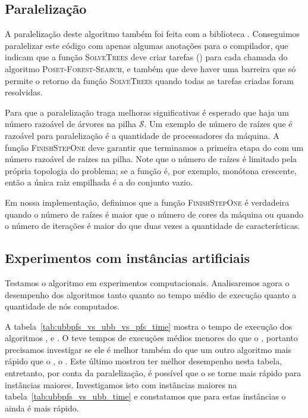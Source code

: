 \subsection{Paralelização}
A paralelização deste algoritmo também foi feita com a biblioteca 
. Conseguimos paralelizar este código com apenas 
algumas anotações para o compilador, que indicam que a função
\textsc{SolveTrees} deve criar tarefas () para cada 
chamada do algoritmo \textsc{Poset-Forest-Search}, e também que deve 
haver uma barreira que só permite o retorno da função 
\textsc{SolveTrees} quando todas as tarefas criadas foram resolvidas.

Para que a paralelização traga melhoras significativas é esperado que
haja um número razoável de árvores na pilha $\mathcal{S}$. Um exemplo de
número de raízes que é razoável para paralelização é a quantidade de
processadores da máquina. A função \textsc{FinishStepOne} deve garantir
que terminamos a primeira etapa do  com um número
razoável de raízes na pilha. Note que o número de raízes é limitado
pela própria topologia do problema; se a função é, por exemplo, monótona
crescente, então a única raiz empilhada é a do conjunto vazio.

Em nossa implementação, definimos que a função \textsc{FinishStepOne} é
verdadeira quando o número de raízes é maior que o número de cores da 
máquina ou quando o número de iterações é maior do que duas vezes a 
quantidade de características. 

\subsection{Experimentos com instâncias artificiais}
Testamos o algoritmo  em experimentos computacionais. Analisaremos agora o desempenho dos algoritmos tanto quanto ao 
tempo médio de execução quanto a quantidade de nós computados.

A tabela~\ref{tab:ubbpfs_vs_ubb_vs_pfs_time} mostra o tempo de execução
dos algoritmos ,  e . O 
 teve tempos de execuções médios menores do que o 
, portanto precisamos investigar se ele é melhor também do
que um outro algoritmo mais rápido que o , o .
Este último mostrou ter melhor desempenho nesta tabela, entretanto, 
por conta da paralelização, é possível que o  se torne 
mais rápido para instâncias maiores. Investigamos isto com instâncias
maiores na tabela~\ref{tab:ubbpfs_vs_ubb_time} e constatamos que 
para estas instâncias o  ainda é mais rápido.

